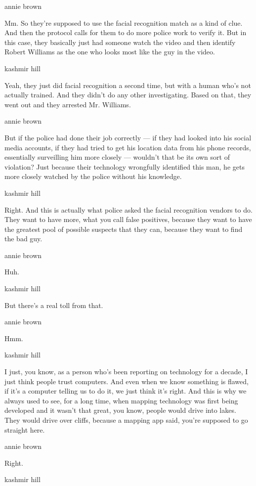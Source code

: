 annie brown

Mm. So they're supposed to use the facial recognition match as a kind of
clue. And then the protocol calls for them to do more police work to
verify it. But in this case, they basically just had someone watch the
video and then identify Robert Williams as the one who looks most like
the guy in the video.

kashmir hill

Yeah, they just did facial recognition a second time, but with a human
who's not actually trained. And they didn't do any other investigating.
Based on that, they went out and they arrested Mr. Williams.

annie brown

But if the police had done their job correctly --- if they had looked
into his social media accounts, if they had tried to get his location
data from his phone records, essentially surveilling him more closely
--- wouldn't that be its own sort of violation? Just because their
technology wrongfully identified this man, he gets more closely watched
by the police without his knowledge.

kashmir hill

Right. And this is actually what police asked the facial recognition
vendors to do. They want to have more, what you call false positives,
because they want to have the greatest pool of possible suspects that
they can, because they want to find the bad guy.

annie brown

Huh.

kashmir hill

But there's a real toll from that.

annie brown

Hmm.

kashmir hill

I just, you know, as a person who's been reporting on technology for a
decade, I just think people trust computers. And even when we know
something is flawed, if it's a computer telling us to do it, we just
think it's right. And this is why we always used to see, for a long
time, when mapping technology was first being developed and it wasn't
that great, you know, people would drive into lakes. They would drive
over cliffs, because a mapping app said, you're supposed to go straight
here.

annie brown

Right.

kashmir hill

